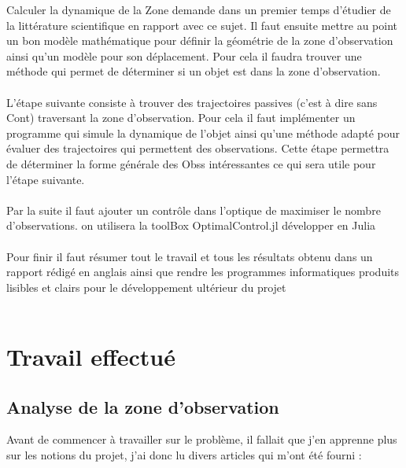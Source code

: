 \documentclass[11pt]{article} %
\begin{document}
		Calculer la dynamique de la \gls{Zone} demande dans un premier temps d'étudier de la littérature scientifique en rapport avec ce sujet. Il faut ensuite mettre au point un bon modèle mathématique pour définir la géométrie de la zone d'observation ainsi qu'un modèle pour son déplacement. Pour cela il faudra trouver une méthode qui permet de déterminer si un objet est dans la zone d'observation.
		\\ \\
		L'étape suivante consiste à trouver des trajectoires passives (c'est à dire sans \gls{Cont}) traversant la zone d'observation. Pour cela il faut implémenter un programme qui simule la dynamique de l'objet ainsi qu'une méthode adapté pour évaluer des trajectoires qui permettent des observations. Cette étape permettra de déterminer la forme générale  des \glspl{Obs} intéressantes ce qui sera utile pour l'étape suivante.
		\\ \\
		Par la suite il faut ajouter un contrôle dans l'optique de maximiser le nombre d'observations. on utilisera la toolBox OptimalControl.jl développer en Julia
		\\ \\
		Pour finir il faut résumer tout le travail et tous les résultats obtenu dans un rapport rédigé en anglais ainsi que rendre les programmes informatiques produits lisibles et clairs pour le développement ultérieur du projet
		\\ \\
		
		\newpage
		\section{Travail effectué}
		
		\subsection{Analyse de la zone d'observation}
		Avant de commencer à travailler sur le problème, il fallait que j'en apprenne plus sur les notions du projet, j'ai donc lu divers articles qui m'ont été fourni :
		
\end{document}
